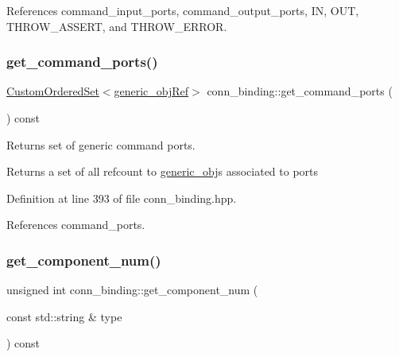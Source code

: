 References command\+\_\+input\+\_\+ports, command\+\_\+output\+\_\+ports, IN, O\+UT, T\+H\+R\+O\+W\+\_\+\+A\+S\+S\+E\+RT, and T\+H\+R\+O\+W\+\_\+\+E\+R\+R\+OR.

\mbox{\label{classconn__binding_a1f0458cf4aaf63d2786931ad13d1ae71}} 
\subsubsection{\texorpdfstring{get\+\_\+command\+\_\+ports()}{get\_command\_ports()}}
{\footnotesize\ttfamily \hyperlink{classCustomOrderedSet}{Custom\+Ordered\+Set}$<$\hyperlink{generic__obj_8hpp_acb533b2ef8e0fe72e09a04d20904ca81}{generic\+\_\+obj\+Ref}$>$ conn\+\_\+binding\+::get\+\_\+command\+\_\+ports (\begin{DoxyParamCaption}{ }\end{DoxyParamCaption}) const\hspace{0.3cm}{\ttfamily [inline]}}



Returns set of generic command ports. 

\begin{DoxyReturn}{Returns}
a set of all refcount to \hyperlink{classgeneric__obj}{generic\+\_\+obj}\textquotesingle{}s associated to ports 
\end{DoxyReturn}


Definition at line 393 of file conn\+\_\+binding.\+hpp.



References command\+\_\+ports.

\mbox{\label{classconn__binding_ae44e000813aa8342a78b2dee1009c66b}} 
\subsubsection{\texorpdfstring{get\+\_\+component\+\_\+num()}{get\_component\_num()}}
{\footnotesize\ttfamily unsigned int conn\+\_\+binding\+::get\+\_\+component\+\_\+num (\begin{DoxyParamCaption}\item[{const std\+::string \&}]{type }\end{DoxyParamCaption}) const}



